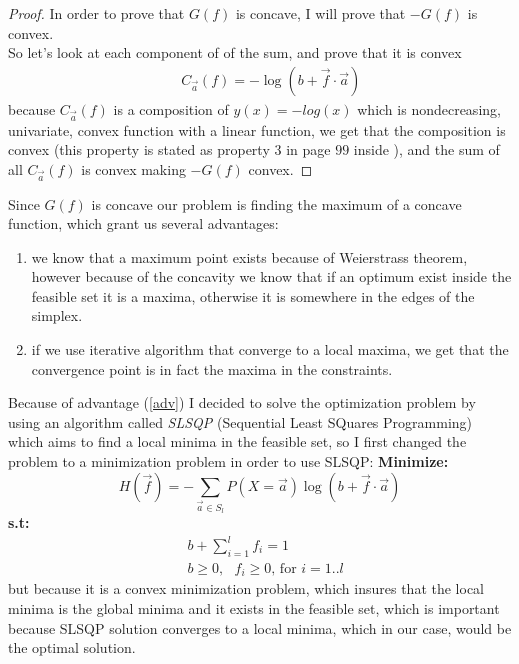 \documentclass{article}
\begin{document}
	\begin{proof}
		In order to prove that $G(f)$ is concave, I will prove that $-G(f)$ is convex.\\
		So let's look at each component of of the sum, and prove that it is convex
		\[
		\begin{aligned}
			&&C_{\overrightarrow{a}}(f) = -\log(b + \overrightarrow{f} \cdot \overrightarrow{a})
		\end{aligned}
		\]
		because $C_{\overrightarrow{a}}(f)$ is a composition of $y(x) = -log(x)$ which is nondecreasing, univariate, convex function with a linear function, we get that the composition is convex (this property is stated as property $3$ in page $99$ inside \cite{NLP}),
		and the sum of all $C_{\overrightarrow{a}}(f)$ is convex making $-G(f)$ convex.
		\newline
	\end{proof}
	Since $G(f)$ is concave our problem is finding the maximum of a concave function, which grant us several advantages:
	\begin{enumerate}
		\item we know that a maximum point exists because of Weierstrass theorem, however because of the concavity we know that if an optimum exist inside the feasible set it is a maxima, otherwise it is somewhere in the edges of the simplex.
		\item if we use iterative algorithm that converge to a local maxima, we get that the convergence point is in fact the maxima in the constraints.
		\label{adv}
	\end{enumerate}
	Because of advantage (\ref{adv}) I decided to solve the optimization problem by using an algorithm called \textit{SLSQP}\cite{SQP}\cite{Scipy}\cite{matlab}
	(Sequential Least SQuares Programming) which aims to find a local minima in the feasible set, so I first changed the problem to a minimization problem in order to use SLSQP:
	\newline\newline
	\textbf{Minimize:} 
	 \[
	H(\overrightarrow{f}) = -\sum_{\overrightarrow{a} \in S_l} P(X=\overrightarrow{a})\log(b + \overrightarrow{f} \cdot \overrightarrow{a} )
	\]
	\textbf{s.t:}
	\[
	\begin{aligned}
		&b + \sum_{i=1}^{l} f_i = 1\\
		&b \ge 0,\text{ }f_i \ge 0 \text{, for } i=1..l
	\end{aligned}
	\]
	but because it is a convex minimization problem, which insures that the local minima is the global minima and it exists in the feasible set, which is important because SLSQP solution converges to a local minima, which in our case, would be the optimal solution.
\end{document}

